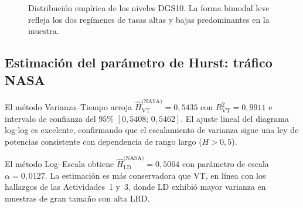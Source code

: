 \begin{figure}[H]
    \centering
    \begin{minipage}[t]{0.48\textwidth}
        \centering
        \caption{Evolución histórica del rendimiento del Tesoro a 10 años.
                 Se distinguen los ciclos de alta inflación (1970--80),
                 la Gran Moderación (1990--2000) y el régimen de tasas
                 bajas post-2008.}
        \label{fig:a6-dgs10-serie}
    \end{minipage}
    \hfill
    \begin{minipage}[t]{0.48\textwidth}
        \centering
        \caption{Distribución empírica de los niveles DGS10. La forma
                 bimodal leve refleja los dos regímenes de tasas altas
                 y bajas predominantes en la muestra.}
        \label{fig:a6-dgs10-hist}
    \end{minipage}
\end{figure}

\subsection{Estimación del parámetro de Hurst: tráfico NASA}

El método Varianza--Tiempo arroja $\hat{H}_{\text{VT}}^{\text{(NASA)}} = 0{,}5435$ con
$R^2_{\text{VT}} = 0{,}9911$ e intervalo de confianza del $95\%$
$[0{,}5408;\,0{,}5462]$. El ajuste lineal del diagrama log-log es excelente,
confirmando que el escalamiento de varianza sigue una ley de potencias
consistente con dependencia de rango largo ($H > 0{,}5$).

El método Log--Escala obtiene $\hat{H}_{\text{LD}}^{\text{(NASA)}} = 0{,}5064$ con parámetro de
escala $\alpha = 0{,}0127$. La estimación es más conservadora que VT, en línea
con los hallazgos de las Actividades~1 y~3, donde LD exhibió mayor varianza en
muestras de gran tamaño con alta LRD.

